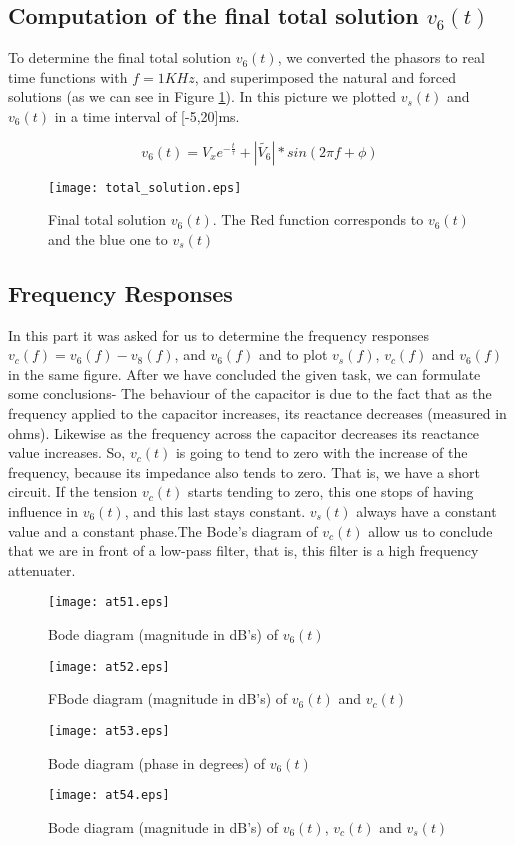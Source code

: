 \subsection{Computation of the final total solution $v_6(t)$}

To determine the final total solution $v_6(t)$, we converted the phasors to real time functions with $f=1KHz$, and superimposed the natural and forced solutions (as we can see in Figure \ref{fig:tot}). In this picture we plotted $v_s(t)$ and $v_6(t)$ in a time interval of [-5,20]ms.

\begin{equation}
  v_6(t)= V_xe^{-\frac{t}{{\displaystyle \tau }}} + |\tilde{V_6}|*sin(2\pi f+ {\displaystyle \phi })
  \label{eq:vo_nat}
\end{equation}
\begin{figure}[h] \centering
\texttt{[image: total\_solution.eps]}
\caption{Final total solution $v_6(t)$. The Red function corresponds to $v_6(t)$ and the blue one to $v_s(t)$}
\label{fig:tot}
\end{figure}



\subsection{Frequency Responses}
In this part it was asked for us to determine the frequency responses $v_c(f)=v_6(f)-v_8(f)$, and $v_6(f)$ and to plot $v_s(f)$,  $v_c(f)$  and $v_6(f)$ in the same figure. After we have concluded the given task, we can formulate some conclusions- The behaviour of the capacitor is due to the fact that as the frequency applied to the capacitor increases, its reactance decreases (measured in ohms). Likewise as the frequency across the capacitor decreases its reactance value increases. So, $v_c(t)$ is going to tend to zero with the increase of the frequency, because its impedance also tends to zero. That is, we have a short circuit. If the tension $v_c(t)$ starts tending to zero, this one stops of having influence in $v_6(t)$, and this last stays constant. $v_s(t)$ always have a constant value and a constant phase.The Bode's diagram of $v_c(t)$ allow us to conclude that we are in front of a low-pass filter, that is, this filter is a high frequency attenuater.

\begin{figure}[h] \centering
\texttt{[image: at51.eps]}
\caption{Bode diagram (magnitude in dB's) of $v_6(t)$ }
\label{fig:51}
\texttt{[image: at52.eps]}
\caption{F{Bode diagram (magnitude in dB's) of $v_6(t)$ and $v_c(t)$}}
\end{figure}

\begin{figure}[h] \centering
\label{fig:52}
\texttt{[image: at53.eps]}
\caption{{Bode diagram (phase in degrees) of $v_6(t)$ } }
\label{fig:53}
\texttt{[image: at54.eps]}
\caption{{Bode diagram (magnitude in dB's) of $v_6(t)$, $v_c(t)$ and $v_s(t)$ }}
\label{fig:54}
\end{figure}


\newpage
